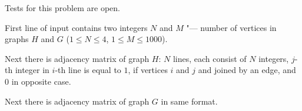 Tests for this problem are open.

First line of input contains two integers $N$ and $M$ "--- number of vertices in graphs $H$ and $G$ ($1 \le N \le 4$, $1 \le M \le 1000$).

Next there is adjacency matrix of graph $H$: $N$ lines,
each consist of $N$ integers, $j$-th integer in $i$-th line is equal to $1$,
if vertices $i$ and $j$ and joined by an edge, and $0$ in opposite case.

Next there is adjacency matrix of graph $G$ in same format.